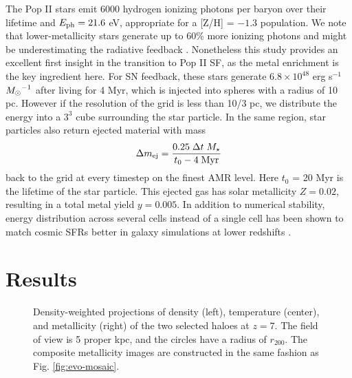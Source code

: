 \documentclass[apjl]{emulateapj}
\begin{document}
The Pop II stars emit 6000 hydrogen ionizing photons per baryon over
their lifetime and $E_{\rm ph} = 21.6$ eV, appropriate for a [Z/H] =
$-1.3$ population.  We note that lower-metallicity stars generate up
to 60\% more ionizing photons and might be underestimating the
radiative feedback \citep{Schaerer03}.  Nonetheless this study
provides an excellent first insight in the transition to Pop II SF, as
the metal enrichment is the key ingredient here.  For SN feedback,
these stars generate $6.8 \times 10^{48}$ erg s$^{-1}$ $\Ms^{-1}$
after living for 4 Myr, which is injected into spheres with a radius
of 10 pc.  However if the resolution of the grid is less than 10/3 pc,
we distribute the energy into a $3^3$ cube surrounding the star
particle.  In the same region, star particles also return ejected
material with mass
%
\begin{equation}
  \label{eqn:SNmass}
  \Delta m_{\rm ej} = \frac{0.25 \; \Delta t \; M_\star} 
         {t_0 - 4\;\mathrm{Myr}}
\end{equation}
back to the grid at every timestep on the finest AMR level.  Here
$t_0$ = 20 Myr is the lifetime of the star particle.  This ejected gas
has solar metallicity $Z = 0.02$, resulting in a total metal yield $y
= 0.005$.  In addition to numerical stability, energy distribution
across several cells instead of a single cell has been shown to match
cosmic SFRs better in galaxy simulations at lower redshifts
\citep{Smith10}.

\section{Results}
\label{sec:results}




\begin{figure}
  \caption{\label{fig:halo-mosaic} Density-weighted projections of
    density (left), temperature (center), and metallicity (right) of
    the two selected haloes at $z=7$.  The field of view is 5 proper
    kpc, and the circles have a radius of $r_{200}$.  The composite
    metallicity images are constructed in the same fashion as
    Fig. \ref{fig:evo-mosaic}.}
\end{figure}


\end{document}
